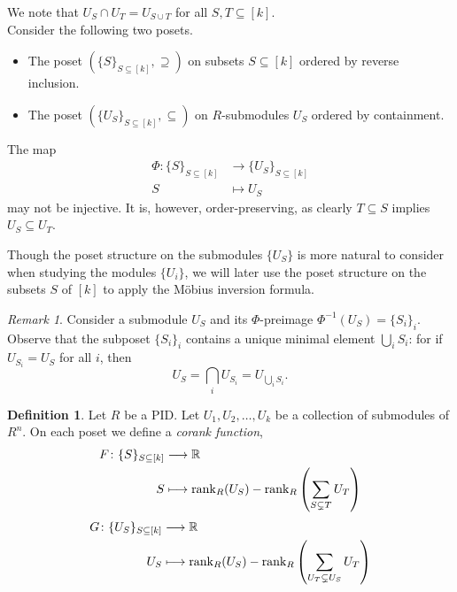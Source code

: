 \documentclass[a4paper]{amsart}
\newcommand{\R}{\mathbb{R}}
\numberwithin{theoremcounter}{section}
\theoremstyle{definition}
\newtheorem{definition}[Defauto]{Definition}
\theoremstyle{remark}
\newtheorem{remark}[remarkauto]{Remark}
\newcommand{\mr}[1]{{\rm #1}}
\newcommand{\rank}{\mr{rank}}
\begin{document}
We note that $U_S \cap U_T = U_{S \cup T}$ for all $S,T \subseteq [k]$. \\

Consider the following two posets. 
\begin{itemize}
\item The poset $(\{ S\}_{ S \subseteq [k]}, \supseteq)$ on subsets $S \subseteq [k]$ ordered by reverse inclusion. \item The poset $(\{ U_S\}_{ S \subseteq [k]}, \subseteq)$ on $R$-submodules $U_S$ ordered by containment. \end{itemize} 

The map 
\begin{align*}
\Phi\colon  \{ S\}_{ S \subseteq [k]} & \longrightarrow \{ U_S\}_{ S \subseteq [k]} \\ 
S & \longmapsto U_S
\end{align*} 
may not be injective. It is, however, order-preserving, as clearly $T \subseteq S$ implies $U_S \subseteq U_T$. 

Though the poset structure on the submodules $\{U_S\}$ is more natural to consider when studying the modules $\{U_i\}$, we will later use the poset structure on the subsets $S$ of $[k]$ to apply the M\"obius inversion formula. 


\begin{remark}\label{preimage} Consider a submodule $U_S$ and its $\Phi$-preimage $\Phi^{-1}(U_S) =\{S_i\}_i$. Observe that the subposet $\{S_i\}_i$ contains a unique minimal element $\bigcup_i S_i$: for if $U_{S_i} = U_{S}$ for all $i$, then 
$$ U_S = \bigcap_i U_{S_i}  = U_{\bigcup_i S_i}.$$ 
\end{remark} 

\begin{definition} Let $R$ be a PID. Let $U_1, U_2, \dots, U_k$ be a collection of submodules of $R^n$. On each poset we define a \emph{corank function}, 
\begin{align*}
F\colon  \{ S\}_{ S \subseteq [k]} & \longrightarrow \R \\ 
S  & \longmapsto \rank_R(U_S) - \rank_R\left(\sum_{S \subsetneq T}  U_T \right)
\end{align*} 
\begin{align*}
G\colon  \{ U_S\}_{ S \subseteq [k]} & \longrightarrow \R \\ 
U_S  & \longmapsto \rank_R(U_S) - \rank_R\left(\sum_{U_T \subsetneq U_S}  U_T \right)
\end{align*} 
\end{definition} 
\end{document}
